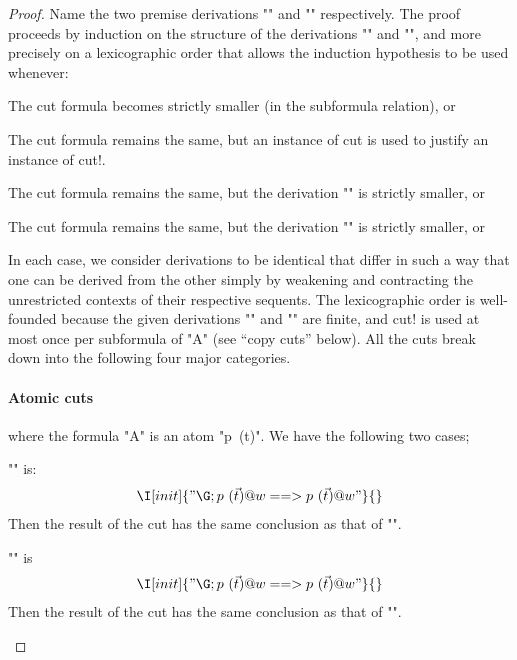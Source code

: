 \documentclass{article}
\begin{document}
\begin{proof}
  Name the two premise derivations 
  "\DD" and "\EE" respectively. The proof proceeds by induction on
  the structure of the derivations "\DD" and "\EE", and more precisely on
  a lexicographic order that allows the induction hypothesis to be used whenever:
  \begin{ecom}
  \item The cut formula becomes strictly smaller (in the subformula relation), or
  \item The cut formula remains the same, but an instance of cut is used to justify an instance of cut!.
  \item The cut formula remains the same, but the derivation "\DD" is strictly smaller, or
  \item The cut formula remains the same, but the derivation "\EE" is strictly smaller, or
  \end{ecom}
  In each case, we consider derivations to be identical that differ in such a way that one can be
  derived from the other simply by weakening and contracting the unrestricted contexts of their
  respective sequents. The lexicographic order is well-founded because the given derivations "\DD"
  and "\EE" are finite, and cut! is used at most once per subformula of "A" (see ``copy cuts''
  below). All the cuts break down into the following four major categories.

  \paragraph{Atomic cuts} where the formula "A" is an atom "p~(\vec t)". We have the following two
  cases;
  \begin{ecom}    
  \item "\DD" is:
    \begin{gather*}
      \I[init]{"\G ; p~(\vec t) @ w ==> p~(\vec t) @ w"}{}
    \end{gather*}
    Then the result of the cut has the same conclusion as that of "\EE".

  \item "\EE" is
    \begin{gather*}
      \I[init]{"\G ; p~(\vec t) @ w ==> p~(\vec t) @ w"}{}
    \end{gather*}
    Then the result of the cut has the same conclusion as that of "\DD".
  \end{ecom}


\end{proof}
\end{document}
